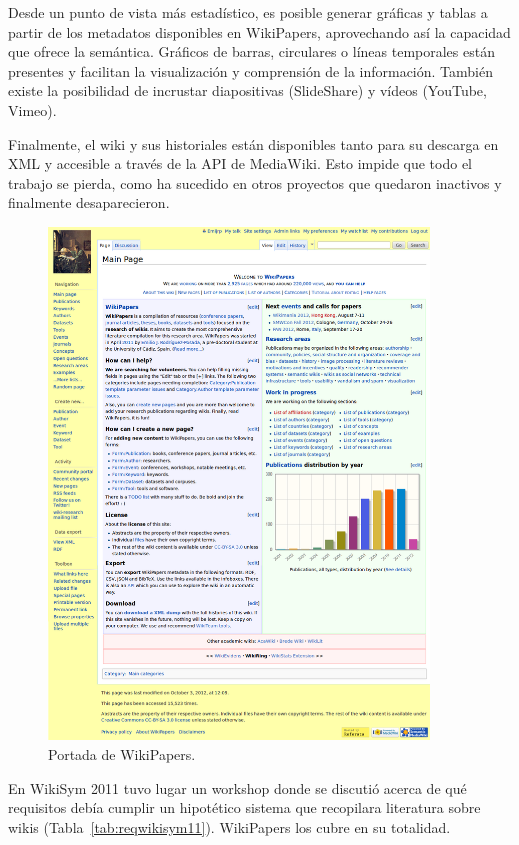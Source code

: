 \documentclass[11pt,onecolumn]{article}
\begin{document}
Desde un punto de vista más estadístico, es posible generar gráficas y tablas a partir de los metadatos disponibles en WikiPapers, aprovechando así la capacidad que ofrece la semántica. Gráficos de barras, circulares o líneas temporales están presentes y facilitan la visualización y comprensión de la información. También existe la posibilidad de incrustar diapositivas (SlideShare) y vídeos (YouTube, Vimeo).

Finalmente, el wiki y sus historiales están disponibles tanto para su descarga en XML y accesible a través de la API de MediaWiki. Esto impide que todo el trabajo se pierda, como ha sucedido en otros proyectos que quedaron inactivos y finalmente desaparecieron.

\begin{figure}[htb]
\centering
\includegraphics[width=0.9\textwidth]{wpfull.png}
\caption{Portada de WikiPapers.}
\label{fig:wpfull}
\end{figure}

En WikiSym 2011 tuvo lugar un workshop\citep{ayers2011} donde se discutió acerca de qué requisitos debía cumplir un hipotético sistema que recopilara literatura sobre wikis (Tabla~\ref{tab:reqwikisym11}). WikiPapers los cubre en su totalidad.
\end{document}
